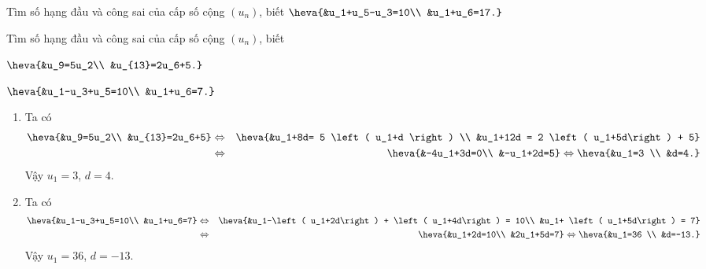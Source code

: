\begin{bt}%
	Tìm số hạng đầu và công sai của cấp số cộng $(u_n)$, biết $\heva{&u_1+u_5-u_3=10\\ &u_1+u_6=17.}$
\end{bt}

\begin{bt}%
	Tìm số hạng đầu và công sai của cấp số cộng $(u_n)$, biết
	\begin{listEX}[2]
		\item $\heva{&u_9=5u_2\\ &u_{13}=2u_6+5.}$
		\item $\heva{&u_1-u_3+u_5=10\\ &u_1+u_6=7.}$
	\end{listEX}
	\loigiai
	{
		\begin{enumerate}
			\item Ta có
			\begin{eqnarray*}
				\heva{&u_9=5u_2\\ &u_{13}=2u_6+5} &\Leftrightarrow& \heva{&u_1+8d= 5 \left( u_1+d \right) \\ &u_1+12d = 2 \left( u_1+5d\right) + 5}\\
				&\Leftrightarrow& \heva{&-4u_1+3d=0\\ &-u_1+2d=5} \Leftrightarrow \heva{&u_1=3 \\ &d=4.}
			\end{eqnarray*}
			Vậy $u_1=3$, $d=4$.
			\item Ta có 
			\begin{eqnarray*}
				\heva{&u_1-u_3+u_5=10\\ &u_1+u_6=7} &\Leftrightarrow& \heva{&u_1-\left( u_1+2d\right) + \left( u_1+4d\right) = 10\\ &u_1+ \left( u_1+5d\right) = 7}\\
				&\Leftrightarrow& \heva{&u_1+2d=10\\ &2u_1+5d=7} \Leftrightarrow \heva{&u_1=36 \\ &d=-13.}
			\end{eqnarray*}
			Vậy $u_1=36$, $d=-13$.
		\end{enumerate}
	}
\end{bt}

